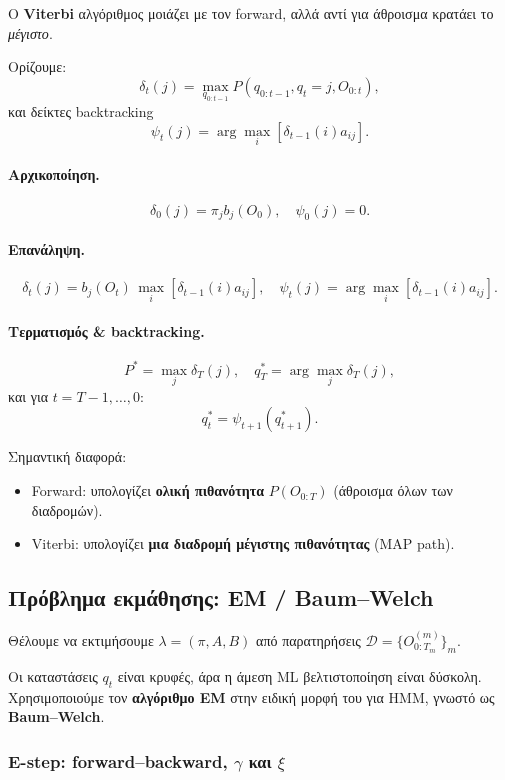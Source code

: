 \documentclass[a4paper,11pt]{article}
\begin{document}
Ο \textbf{Viterbi} αλγόριθμος μοιάζει με τον forward, αλλά αντί για
άθροισμα κρατάει το \emph{μέγιστο}.

Ορίζουμε:
\[
\delta_t(j) = \max_{q_{0:t-1}}
P(q_{0:t-1}, q_t=j, O_{0:t}),
\]
και δείκτες backtracking
\[
\psi_t(j) = \arg\max_i \left[ \delta_{t-1}(i) a_{ij} \right].
\]

\paragraph{Αρχικοποίηση.}
\[
\delta_0(j) = \pi_j b_j(O_0),\quad
\psi_0(j) = 0.
\]

\paragraph{Επανάληψη.}
\[
\delta_t(j) = b_j(O_t)\, \max_i [\delta_{t-1}(i) a_{ij}],
\quad
\psi_t(j) = \arg\max_i [\delta_{t-1}(i) a_{ij}].
\]

\paragraph{Τερματισμός \& backtracking.}
\[
P^\ast = \max_j \delta_T(j),\quad
q_T^\ast = \arg\max_j \delta_T(j),
\]
και για $t=T-1,\dots,0$:
\[
q_t^\ast = \psi_{t+1}(q_{t+1}^\ast).
\]

Σημαντική διαφορά:
\begin{itemize}
  \item Forward: υπολογίζει \textbf{ολική πιθανότητα} $P(O_{0:T})$ (άθροισμα όλων των διαδρομών).
  \item Viterbi: υπολογίζει \textbf{μια διαδρομή μέγιστης πιθανότητας} (MAP path).
\end{itemize}

\subsection{Πρόβλημα εκμάθησης: EM / Baum–Welch}

Θέλουμε να εκτιμήσουμε $\lambda = (\pi, A, B)$ από παρατηρήσεις
$\mathcal{D} = \{O^{(m)}_{0:T_m}\}_m$.

Οι καταστάσεις $q_t$ είναι κρυφές, άρα η άμεση ML βελτιστοποίηση είναι δύσκολη.
Χρησιμοποιούμε τον \textbf{αλγόριθμο EM} στην ειδική μορφή του για HMM,
γνωστό ως \textbf{Baum–Welch}.

\subsubsection*{E-step: forward–backward, $\gamma$ και $\xi$}
\end{document}
